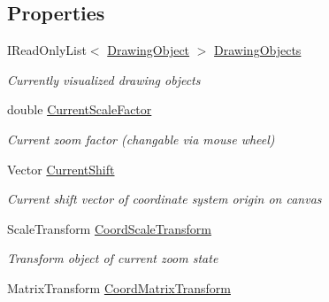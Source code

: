 \subsection*{Properties}
\begin{DoxyCompactItemize}
\item 
I\+Read\+Only\+List$<$ \hyperlink{class_w_p_f_visualization_base_1_1_drawing_object}{Drawing\+Object} $>$ \hyperlink{class_w_p_f_visualization_base_1_1_drawing_on_coordinate_system_a7ac738ab1fbb3159f586cc6f55675c45}{Drawing\+Objects}
\begin{DoxyCompactList}\small\item\em Currently visualized drawing objects \end{DoxyCompactList}\item 
double \hyperlink{class_w_p_f_visualization_base_1_1_drawing_on_coordinate_system_a76bef413d97a0ce03ab983b66cb3cdfb}{Current\+Scale\+Factor}
\begin{DoxyCompactList}\small\item\em Current zoom factor (changable via mouse wheel) \end{DoxyCompactList}\item 
Vector \hyperlink{class_w_p_f_visualization_base_1_1_drawing_on_coordinate_system_ae70f7257a119ae1c6b01f547cabecae4}{Current\+Shift}
\begin{DoxyCompactList}\small\item\em Current shift vector of coordinate system origin on canvas \end{DoxyCompactList}\item 
Scale\+Transform \hyperlink{class_w_p_f_visualization_base_1_1_drawing_on_coordinate_system_a4add8c755b9450114cf14777a16a5d1a}{Coord\+Scale\+Transform}
\begin{DoxyCompactList}\small\item\em Transform object of current zoom state \end{DoxyCompactList}\item 
Matrix\+Transform \hyperlink{class_w_p_f_visualization_base_1_1_drawing_on_coordinate_system_a6be0e4f405a91aec47eefcbd70471672}{Coord\+Matrix\+Transform}

\end{DoxyCompactItemize}

